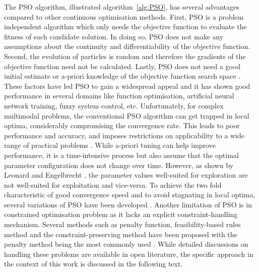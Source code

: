 	The PSO algorithm, illustrated algorithm~\ref{alg:PSO}, has several advantages compared to other continuous optimisation methods. First, PSO is a problem independent algorithm which only needs the objective function to evaluate the fitness of each candidate solution. In doing so, PSO does not make any assumptions about the continuity and differentiability of the objective function. Second, the evolution of particles is random and therefore the gradients of the objective function need not be calculated. Lastly, PSO does not need a good initial estimate or a-priori knowledge of the objective function search space \cite{Freitas:2020aa}. These factors have led PSO to gain a widespread appeal and it has shown good performance in several domains like function optimisation, artificial neural network training, fuzzy system control, etc. Unfortunately, for complex multimodal problems, the conventional PSO algorithm can get trapped in local optima, considerably compromising the convergence rate. This leads to poor performance and accuracy, and imposes restrictions on applicability to a wide range of practical problems \cite{Xu:2013aa,Harrison:2018aa}. While a-priori tuning can help improve performance, it is a time-intensive process but also assume that the optimal parameter configuration does not change over time. However, as shown by Leonard and Engelbrecht \cite{Leonard:2013aa}, the parameter values well-suited for exploration are not well-suited for exploitation and vice-versa. To achieve the two fold characteristic of good convergence speed and to avoid stagnating in local optima, several variations of PSO have been developed \cite{Shi:1998aa,Ratnaweera:2004aa,Chatterjee:2006aa,Fan:2007aa,van-den-Bergh:2001aa}. Another limitation of PSO is in constrained optimisation problem as it lacks an explicit constraint-handling mechanism. Several methods such as penalty function, feasibility-based rules method and the constraint-preserving method have been proposed with the penalty method being the most commonly used \cite{Sun:2011aa,Jordehi:2015aa}. While detailed discussions on handling these problems are available in open literature, the specific approach in the context of this work is discussed in the following text. 	
	
